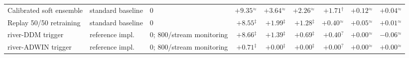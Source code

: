 \begin{table}[t]
\begin{tabular}{l l l r r r r r r}
Calibrated soft ensemble & standard baseline & 0 & $+9.35$$^{\approx}$ & $+3.64$$^{\approx}$ & $+2.26$$^{\approx}$ & $+1.71$$^{\dagger}$ & $+0.12$$^{\approx}$ & $+0.04$$^{\approx}$ \\
Replay 50/50 retraining & standard baseline & 0 & $+8.55$$^{\ddagger}$ & $+1.99$$^{\ddagger}$ & $+1.28$$^{\ddagger}$ & $+0.40$$^{\approx}$ & $+0.05$$^{\approx}$ & $+0.01$$^{\approx}$ \\
river-DDM trigger & reference impl. & 0; 800/stream monitoring & $+8.66$$^{\ddagger}$ & $+1.39$$^{\ddagger}$ & $+0.69$$^{\ddagger}$ & $+0.40$$^{?}$ & $+0.00$$^{\approx}$ & $-0.06$$^{\approx}$ \\
river-ADWIN trigger & reference impl. & 0; 800/stream monitoring & $+0.71$$^{\ddagger}$ & $+0.00$$^{\ddagger}$ & $+0.00$$^{\ddagger}$ & $+0.00$$^{?}$ & $+0.00$$^{\approx}$ & $+0.00$$^{\approx}$ \\
\bottomrule
\end{tabular}
\end{table}
